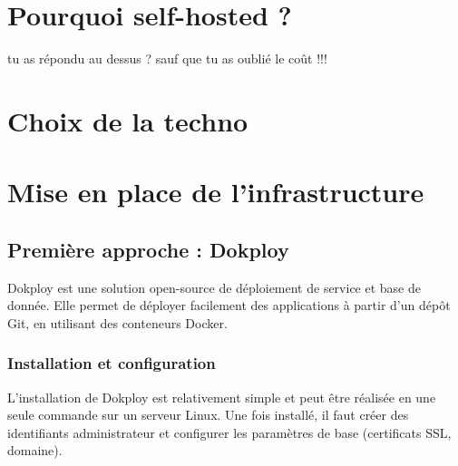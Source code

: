 \documentclass{report} %
\begin{document}
\chapter{Pourquoi self-hosted ?}

{\color{red} tu as répondu au dessus ?  sauf que tu as oublié le coût !!!}

\chapter{Choix de la techno}



\chapter{Mise en place de l'infrastructure}

\section{Première approche : Dokploy}
Dokploy est une solution open-source de déploiement de service et base de donnée. %
Elle permet de déployer facilement des applications à partir d’un dépôt Git, en utilisant des conteneurs Docker.

\subsection{Installation et configuration}
L’installation de Dokploy est relativement simple et peut être réalisée en une seule commande sur un serveur Linux.
Une fois installé, il faut créer des identifiants administrateur et configurer les paramètres de base (certificats SSL, domaine).
\end{document}
